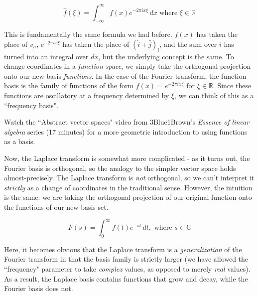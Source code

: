 \begin{equation*}
  \hat{f}(\xi) = \int_{-\infty}^\infty f(x) e^{-2\pi ix \xi} \,dx
    \text{ where } \xi \in \mathbb{R}
\end{equation*}

This is fundamentally the same formula we had before. $f(x)$ has taken the place
of $v_n$, $e^{-2\pi ix \xi}$ has taken the place of $(\hat{i} + \hat{j})_i$, and
the sum over $i$ has turned into an integral over $dx$, but the underlying
concept is the same. To change coordinates in a \textit{function space}, we
simply take the orthogonal projection onto our new basis \textit{functions}. In
the case of the Fourier transform, the function basis is the family of functions
of the form $f(x) = e^{-2\pi ix \xi} \text{ for } \xi \in \mathbb{R}$. Since
these functions are oscillatory at a frequency determined by $\xi$, we can think
of this as a ``frequency basis".

\begin{remark}
  Watch the ``Abstract vector spaces" video from 3Blue1Brown's \textit{Essence
  of linear algebra} series (17 minutes)
  \cite{bib:linalg_abstract_vector_spaces} for a more geometric introduction to
  using functions as a basis.
\end{remark}

Now, the Laplace transform is somewhat more complicated - as it turns out, the
Fourier basis is orthogonal, so the analogy to the simpler vector space holds
almost-precisely. The Laplace transform is \textit{not} orthogonal, so we can't
interpret it \textit{strictly} as a change of coordinates in the traditional
sense. However, the intuition is the same: we are taking the orthogonal
projection of our original function onto the functions of our new basis set.

\begin{equation*}
  F(s) = \int_0^\infty f(t) e^{-st} \,dt, \text{ where } s \in \mathbb{C}
\end{equation*}

Here, it becomes obvious that the Laplace transform is a \textit{generalization}
of the Fourier transform in that the basis family is strictly larger (we have
allowed the ``frequency" parameter to take \textit{complex} values, as opposed
to merely \textit{real} values). As a result, the Laplace basis contains
functions that grow and decay, while the Fourier basis does not.
